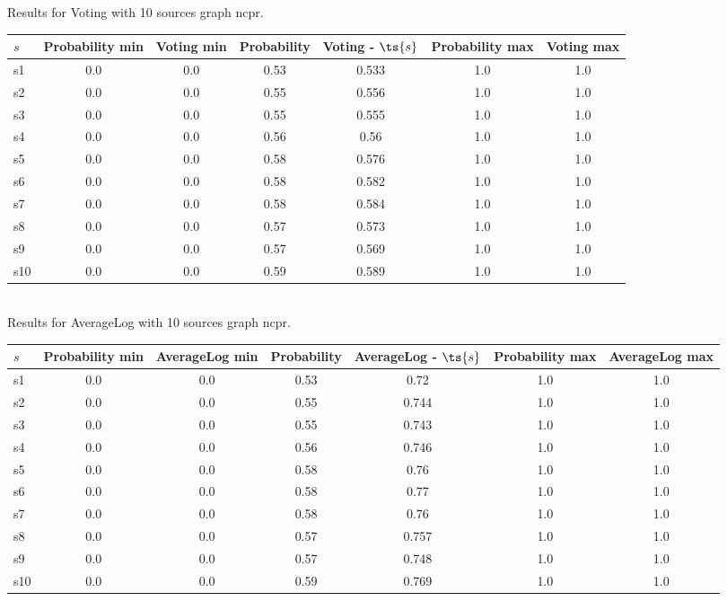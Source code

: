 \documentclass{article}
\begin{document}
\noindent Results for Voting with 10 sources graph ncpr.

\noindent\begin{tabular}{|l|c|c|c|c|c|c|}
\hline
$s$& Probability min & Voting min & Probability & Voting - $\ts{s}$ & Probability max & Voting max\\
\hline
s1 &0.0 & 0.0 & 0.53 & 0.533 & 1.0 & 1.0\\
\hline
s2 &0.0 & 0.0 & 0.55 & 0.556 & 1.0 & 1.0\\
\hline
s3 &0.0 & 0.0 & 0.55 & 0.555 & 1.0 & 1.0\\
\hline
s4 &0.0 & 0.0 & 0.56 & 0.56 & 1.0 & 1.0\\
\hline
s5 &0.0 & 0.0 & 0.58 & 0.576 & 1.0 & 1.0\\
\hline
s6 &0.0 & 0.0 & 0.58 & 0.582 & 1.0 & 1.0\\
\hline
s7 &0.0 & 0.0 & 0.58 & 0.584 & 1.0 & 1.0\\
\hline
s8 &0.0 & 0.0 & 0.57 & 0.573 & 1.0 & 1.0\\
\hline
s9 &0.0 & 0.0 & 0.57 & 0.569 & 1.0 & 1.0\\
\hline
s10 &0.0 & 0.0 & 0.59 & 0.589 & 1.0 & 1.0\\
\hline
\end{tabular}\\

\noindent Results for AverageLog with 10 sources graph ncpr.

\noindent\begin{tabular}{|l|c|c|c|c|c|c|}
\hline
$s$& Probability min & AverageLog min & Probability & AverageLog - $\ts{s}$ & Probability max & AverageLog max\\
\hline
s1 &0.0 & 0.0 & 0.53 & 0.72 & 1.0 & 1.0\\
\hline
s2 &0.0 & 0.0 & 0.55 & 0.744 & 1.0 & 1.0\\
\hline
s3 &0.0 & 0.0 & 0.55 & 0.743 & 1.0 & 1.0\\
\hline
s4 &0.0 & 0.0 & 0.56 & 0.746 & 1.0 & 1.0\\
\hline
s5 &0.0 & 0.0 & 0.58 & 0.76 & 1.0 & 1.0\\
\hline
s6 &0.0 & 0.0 & 0.58 & 0.77 & 1.0 & 1.0\\
\hline
s7 &0.0 & 0.0 & 0.58 & 0.76 & 1.0 & 1.0\\
\hline
s8 &0.0 & 0.0 & 0.57 & 0.757 & 1.0 & 1.0\\
\hline
s9 &0.0 & 0.0 & 0.57 & 0.748 & 1.0 & 1.0\\
\hline
s10 &0.0 & 0.0 & 0.59 & 0.769 & 1.0 & 1.0\\
\hline
\end{tabular}\\
\end{document}
